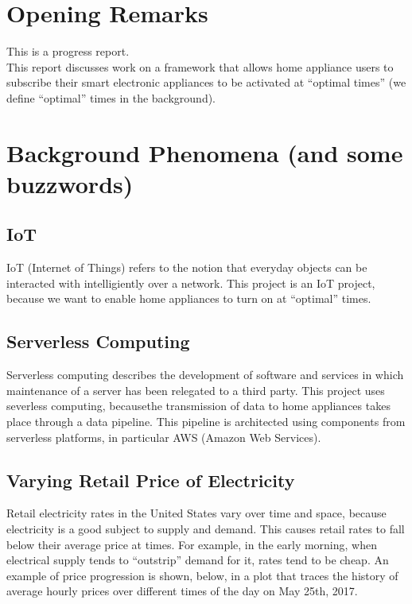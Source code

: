 \documentclass[a4paper]{article}
\begin{document}
\tableofcontents
\section{Opening Remarks}


This is a progress report. \\

This report discusses work on a framework that allows home appliance users to subscribe their smart electronic appliances  to be activated at ``optimal times'' (we define ``optimal'' times in the background). \\

\section{Background Phenomena (and some buzzwords)}

\subsection{IoT}
IoT (Internet of Things) refers to the notion that everyday objects can be interacted with intelligiently over a network. This project is an IoT project, because we want to enable home appliances to turn on at ``optimal'' times.

\subsection{Serverless Computing}
Serverless computing describes the development of software and services in which maintenance of a server has been relegated to a third party. This project uses severless computing, becausethe transmission of data to home appliances takes place through a data pipeline. This pipeline is architected using components from serverless platforms, in particular AWS (Amazon Web Services).

\subsection{Varying Retail Price of Electricity}
Retail electricity rates in the United States vary over time and space, because electricity is a good subject to supply and demand. This causes retail rates to fall below their average price at times. For example, in the early morning, when electrical supply tends to ``outstrip'' demand for it, rates tend to be cheap. An example of price progression is shown, below, in a plot that traces the history of average hourly prices over different times of the day on May 25th, 2017.
\end{document}
